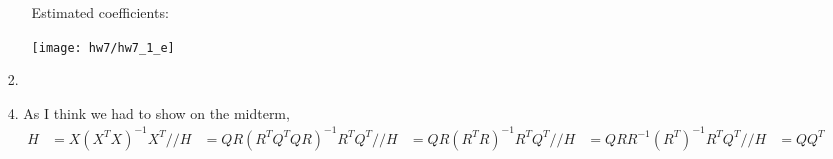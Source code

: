 \documentclass[11pt]{article}
\theoremstyle{definition}
\begin{document}
\begin{itemize}
\begin{itemize}
                \smallskip
                Estimated coefficients:
                \FloatBarrier
                 
                \FloatBarrier
                \begin{center}
                    \texttt{[image: hw7/hw7\_1\_e]} 
                \end{center}
        \end{itemize}
    \item[2.]
    \item[4.]
        As I think we had to show on the midterm,
        \begin{align*}
            H&= X(X^TX)^{-1}X^T //
            H&= QR(R^TQ^TQR)^{-1}R^TQ^T //
            H&= QR(R^TR)^{-1}R^TQ^T //
            H&= QRR^{-1}(R^T)^{-1}R^TQ^T //
            H&= QQ^T
        \end{align*}
 

\end{itemize}
\end{document}
